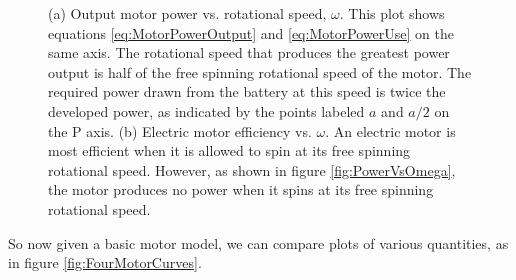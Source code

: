 \begin{figure}[h]		%
\begin{center}
  \hspace{0.05\textwidth}%
\end{center}
\caption[Plot: Electric Motor Power and Efficiency vs. $\omega$.] {(a) Output motor power vs. rotational speed, $\omega$. This plot shows equations \ref{eq:MotorPowerOutput} and \ref{eq:MotorPowerUse} on the same axis. The rotational speed that produces the greatest power output is half of the free spinning rotational speed of the motor. The required power drawn from the battery at this speed is twice the developed power, as indicated by the points labeled $a$ and $a/2$ on the P axis.  (b) Electric motor efficiency vs. $\omega$. An electric motor is most efficient when it is allowed to spin at its free spinning rotational speed. However, as shown in figure \ref{fig:PowerVsOmega}, the motor produces no power when it spins at its free spinning rotational speed.}
\label{fig:MotorPowerAndEfficiency}
\end{figure}
%

So now given a basic motor model, we can compare plots of various quantities, as in figure \ref{fig:FourMotorCurves}.

